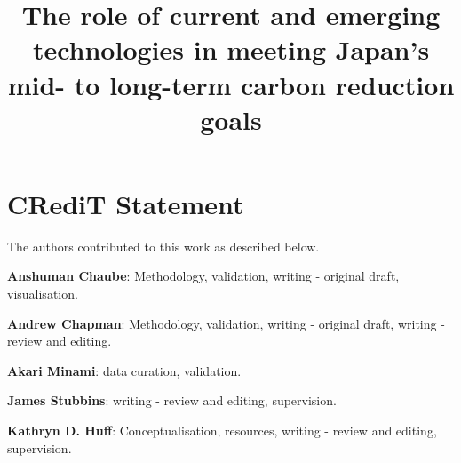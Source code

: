 \documentclass[review]{elsarticle}
\begin{document}
\begin{frontmatter}
\title{The role of current and emerging technologies in meeting Japan's mid- to long-term carbon reduction goals}
\end{frontmatter}
\section*{CRediT Statement}

The authors contributed to this work as described below.

\textbf{Anshuman Chaube}: Methodology, validation, writing - original draft, visualisation.

\textbf{Andrew Chapman}: Methodology, validation,  writing - original draft, writing - review and editing.

\textbf{Akari Minami}: data curation, validation.

\textbf{James Stubbins}: writing - review and editing, supervision. 

\textbf{Kathryn D. Huff}: Conceptualisation, resources, writing - review and editing, supervision.
\end{document}
